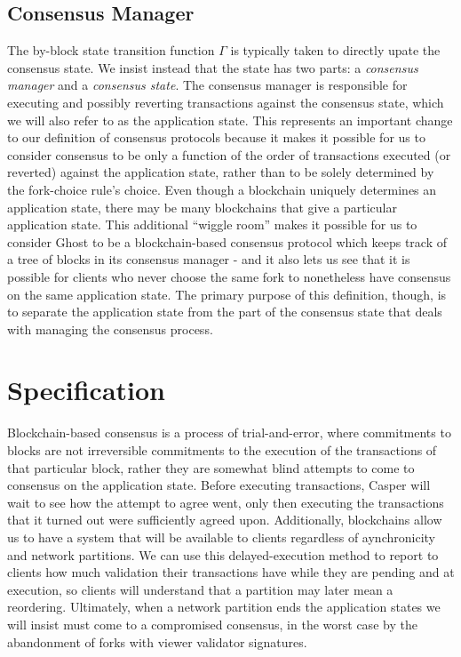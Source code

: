 \documentclass[11pt,a4paper]{article}
\begin{document}
\subsection{Consensus Manager}

The by-block state transition function $\Gamma$ is typically taken to directly upate the consensus state. We insist instead that the state has two parts: a \emph{consensus manager} and a \emph{consensus state}. The consensus manager is responsible for executing and possibly reverting transactions against the consensus state, which we will also refer to as the application state. This represents an important change to our definition of consensus protocols because it makes it possible for us to consider consensus to be only a function of the order of transactions executed (or reverted) against the application state, rather than to be solely determined by the fork-choice rule's choice. Even though a blockchain uniquely determines an application state, there may be many blockchains that give a particular application state. This additional ``wiggle room'' makes it possible for us to consider Ghost to be a blockchain-based consensus protocol which keeps track of a tree of blocks in its consensus manager - and it also lets us see that it is possible for clients who never choose the same fork to nonetheless have consensus on the same application state. The primary purpose of this definition, though, is to separate the application state from the part of the consensus state that deals with managing the consensus process.

\section{Specification}

Blockchain-based consensus is a process of trial-and-error, where commitments to blocks are not irreversible commitments to the execution of the transactions of that particular block, rather they are somewhat blind attempts to come to consensus on the application state. Before executing transactions, Casper will wait to see how the attempt to agree went, only then executing the transactions that it turned out were sufficiently agreed upon. Additionally, blockchains allow us to have a system that will be available to clients regardless of aynchronicity and network partitions. We can use this delayed-execution method to report to clients how much validation their transactions have while they are pending and at execution, so clients will understand that a partition may later mean a reordering. Ultimately, when a network partition ends the application states we will insist must come to a compromised consensus, in the worst case by the abandonment of forks with viewer validator signatures. 
\end{document}
